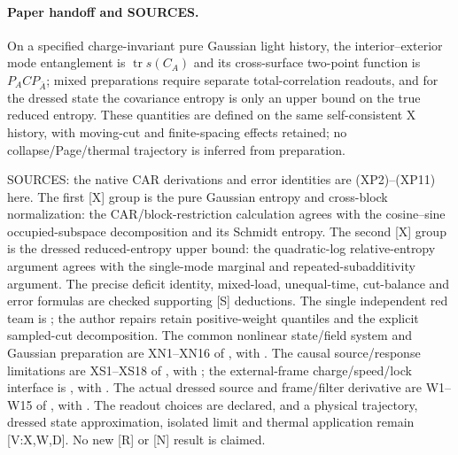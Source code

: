 \documentclass[11pt]{article}
\DeclareMathOperator{\tr}{tr}
\begin{document}
\paragraph{Paper handoff and SOURCES.}
On a specified charge-invariant pure Gaussian light history, the interior--exterior
mode entanglement is $\tr s(C_A)$ and its cross-surface two-point
function is $P_A C P_{\bar A}$; mixed preparations require separate
total-correlation readouts, and for the dressed state the
covariance entropy is only an upper bound on the true reduced
entropy.  These quantities are defined on the same self-consistent
X history, with moving-cut and finite-spacing effects retained;
no collapse/Page/thermal trajectory is inferred from preparation.

SOURCES: the native CAR derivations and error identities are
(XP2)--(XP11) here.  The first [X] group is the pure Gaussian
entropy and cross-block normalization: the CAR/block-restriction
calculation agrees with the cosine--sine occupied-subspace
decomposition and its Schmidt entropy.  The second [X] group
is the dressed reduced-entropy upper bound: the quadratic-log
relative-entropy argument agrees with the single-mode marginal
and repeated-subadditivity argument.  The precise deficit
identity, mixed-load, unequal-time, cut-balance and error
formulas are checked supporting [S] deductions.
The single independent red team is
; the author repairs
retain positive-weight quantiles and the explicit sampled-cut
decomposition.  The common nonlinear state/field system and
Gaussian preparation are XN1--XN16 of
, with
.
The causal source/response limitations are XS1--XS18 of
, with
; the external-frame
charge/speed/lock interface is
, with .
The actual dressed source and frame/filter derivative are
W1--W15 of , with
.
The readout choices are declared, and a physical trajectory,
dressed state approximation, isolated limit and thermal
application remain [V:X,W,D].  No new [R] or [N] result is claimed.
\end{document}
